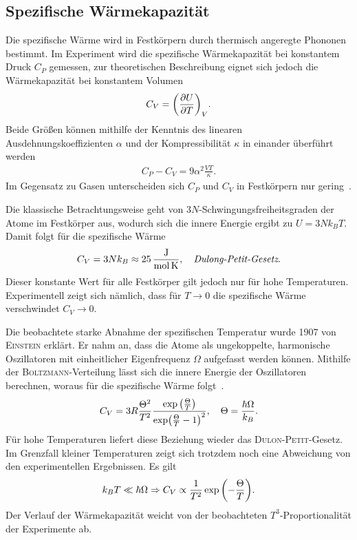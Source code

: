 \documentclass[parskip=half, a4paper,twoside,final]{article}
\begin{document}

\FloatBarrier

\subsection{Spezifische Wärmekapazität}
Die spezifische Wärme wird in Festkörpern durch thermisch angeregte Phononen bestimmt. Im Experiment wird die spezifische Wärmekapazität bei konstantem Druck $C_P$ gemessen, zur theoretischen Beschreibung eignet sich jedoch die Wärmekapazität bei konstantem Volumen
\begin{align}
  C_V = \qty(\pdv{U}{T})_V.
\end{align}
Beide Größen können mithilfe der Kenntnis des linearen Ausdehnungskoeffizienten $\alpha$ und der Kompressibilität $\kappa$ in einander überführt werden
\begin{align}
  C_P - C_V = 9 \alpha^2 \frac{V T}{\kappa}.
\end{align}
Im Gegensatz zu Gasen unterscheiden sich $C_P$ und $C_V$ in Festkörpern nur gering~\cite{Hunklinger}.

Die klassische Betrachtungsweise geht von $3N$-Schwingungsfreiheitsgraden der Atome im Festkörper aus, wodurch sich die innere Energie ergibt zu $U = 3 N k_B T$. Damit folgt für die spezifische Wärme
\begin{align}
  C_V = 3 N k_B \approx  \SI{25}{\joule\per\mole\per\kelvin}, \quad \emph{Dulong-Petit-Gesetz}.
\end{align}
Dieser konstante Wert für alle Festkörper gilt jedoch nur für hohe Temperaturen. Experimentell zeigt sich nämlich, dass für $T \to 0$ die spezifische Wärme verschwindet $C_V \to 0$.

Die beobachtete starke Abnahme der spezifischen Temperatur wurde 1907 von \textsc{Einstein} erklärt. Er nahm an, dass die Atome als ungekoppelte, harmonische Oszillatoren mit einheitlicher Eigenfrequenz $\Omega$ aufgefasst werden können. Mithilfe der \textsc{Boltzmann}-Verteilung lässt sich die innere Energie der Oszillatoren berechnen, woraus für die spezifische Wärme folgt~\cite{Demtröder3}.
\begin{align}
  C_V = 3R\frac{\Theta^2}{T^2} \frac{\exp\qty(\frac{\Theta}{T})}{\exp(\frac{\Theta}{T}-1)^2}, \quad \Theta = \frac{\hbar \Omega}{k_B}.
\end{align}
Für hohe Temperaturen liefert diese Beziehung wieder das \textsc{Dulon-Petit}-Gesetz. Im Grenzfall kleiner Temperaturen zeigt sich trotzdem noch eine Abweichung von den experimentellen Ergebnissen. Es gilt
\begin{align}
  k_B T \ll \hbar \Omega  \Rightarrow C_V \propto \frac{1}{T^2} \exp\qty(-\frac{\Theta}{T}).
\end{align}
Der Verlauf der Wärmekapazität weicht von der beobachteten $T^3$-Proportionalität der Experimente ab.
\end{document}
